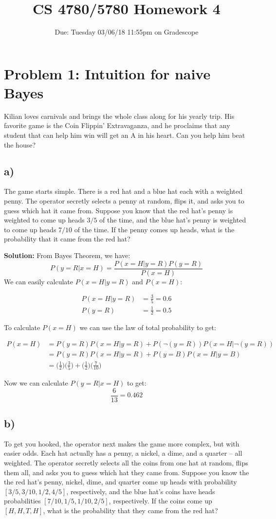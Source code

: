 \documentclass[a4paper]{article}
\title{CS 4780/5780 Homework 4\vspace{-10pt}}
\author{Due: Tuesday 03/06/18 11:55pm on Gradescope}
\date{\vspace{-20pt}}
\begin{document}
\maketitle

\section*{Problem 1: Intuition for naive Bayes}
Kilian loves carnivals and brings the whole class along for his yearly trip. His favorite game is the Coin Flippin' Extravaganza, and he proclaims that any student that can help him win will get an A in his heart. Can you help him beat the house?


\subsection*{a)}
The game starts simple. There is a red hat and a blue hat each with a weighted penny. The operator secretly selects a penny at random, flips it, and asks you to guess which hat it came from. Suppose you know that the red hat's penny is weighted to come up heads $3/5$ of the time, and the blue hat's penny is weighted to come up heads $7/10$ of the time. If the penny comes up heads, what is the probability that it came from the red hat?

\textbf{Solution:}
From Bayes Theorem, we have: $${P(y = R|x = H)} = \frac{P(x = H|y = R)P(y = R)}{P(x = H)}$$We can easily calculate $P(x = H|y = R)$ and $P(x = H)$: 

\begin{align*}
P(x = H|y = R) &= \frac{3}{5}  = 0.6\\
P(y = R) &= \frac{1}{2} = 0.5
\end{align*}

To calculate $P(x = H)$ we can use the law of total probability to get:

\begin{align*}
P(x = H) &= P(y = R)P(x = H|y = R) + P(\neg (y = R))P(x = H|\neg (y = R))\\
&= P(y = R)P(x = H|y = R) + P(y = B)P(x = H|y = B)\\ 
&= \Big(\frac{1}{2}\Big)\Big(\frac{3}{5}\Big) + \Big(\frac{1}{2}\Big)\Big(\frac{7}{10}\Big)
\end{align*}


Now we can calculate $P(y = R|x = H)$ to get: $$ \frac{6}{13} = 0.462$$

\subsection*{b)}
To get you hooked, the operator next makes the game more complex, but with easier odds. Each hat actually has a penny, a nickel, a dime, and a quarter -- all weighted. The operator secretly selects all the coins from one hat at random, flips them all, and asks you to guess which hat they came from. Suppose you know the the red hat's penny, nickel, dime, and quarter come up heads with probability $[3/5, 3/10, 1/2, 4/5]$, respectively, and the blue hat's coins have heads probabilities $[7/10, 1/5, 1/10, 2/5]$, respectively. If the coins come up $[H,H,T,H]$, what is the probability that they came from the red hat?
\end{document}
